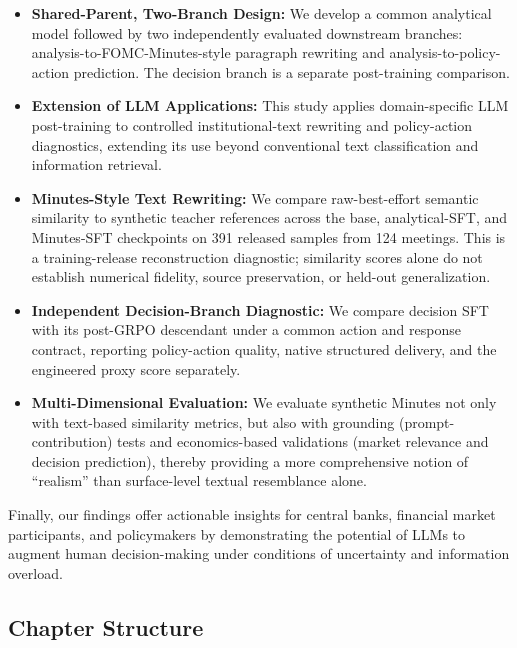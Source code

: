 \begin{itemize}
\item[] \textbf{Shared-Parent, Two-Branch Design:} We develop a common analytical model followed by two independently evaluated downstream branches: analysis-to-FOMC-Minutes-style paragraph rewriting and analysis-to-policy-action prediction. The decision branch is a separate post-training comparison.

\item[] \textbf{Extension of LLM Applications:} This study applies
domain-specific LLM post-training to controlled institutional-text rewriting and policy-action diagnostics, extending its use beyond conventional text classification and information retrieval.


\item[] \textbf{Minutes-Style Text Rewriting:} We compare raw-best-effort semantic similarity to synthetic teacher references across the base, analytical-SFT, and Minutes-SFT checkpoints on 391 released samples from 124 meetings. This is a training-release reconstruction diagnostic; similarity scores alone do not establish numerical fidelity, source preservation, or held-out generalization.


\item[] \textbf{Independent Decision-Branch Diagnostic:} We compare decision SFT with its post-GRPO descendant under a common action and response contract, reporting policy-action quality, native structured delivery, and the engineered proxy score separately.


\item[] \textbf{Multi-Dimensional Evaluation:} We evaluate synthetic Minutes not only with text-based similarity metrics, but also with grounding (prompt-contribution) tests and economics-based validations (market relevance and decision prediction), thereby providing a more comprehensive notion of ``realism'' than surface-level textual resemblance alone.
\end{itemize}


Finally, our findings offer actionable insights for central banks, financial market participants, and policymakers by demonstrating the potential of LLMs to augment human decision-making under conditions of uncertainty and information overload.




\subsection*{Chapter Structure}

